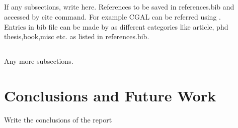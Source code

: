 \documentclass[preprint,5p,times,twocolumn]{elsarticle}
\begin{document}
                
           
\subsection{}
    If any subsections, write here. References to be saved in references.bib and accessed by cite command. For example CGAL can be referred using  \cite{cgal}. 
    \\
    Entries in bib file can be made by as different categories like article, phd thesis,book,misc etc. as listed in references.bib.

  \subsection{}   
  Any more subsections.
   

           \section{Conclusions and Future Work}
           Write the conclusions of the report
          
           
        









\end{document}
